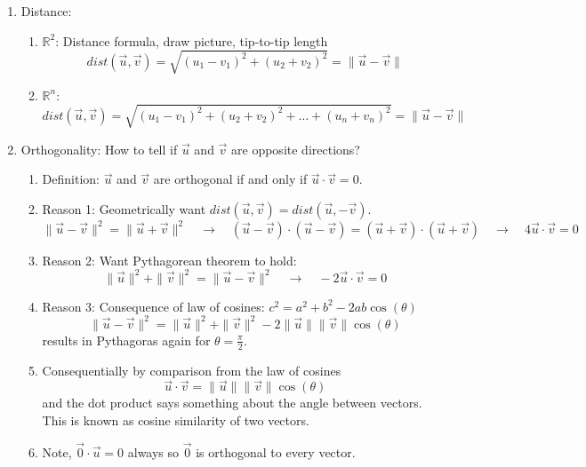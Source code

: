\documentclass{article}
\begin{document}
\begin{enumerate}
\item Distance: 
\begin{enumerate}
\item $\mathbb{R}^2$: Distance formula, draw picture, tip-to-tip length
\[
dist(\vec{u}, \vec{v}) = \sqrt{(u_1-v_1)^2 + (u_2+v_2)^2} = \|\vec{u}-\vec{v}\|
\]%
\item $\mathbb{R}^n$: 
\[
dist(\vec{u}, \vec{v}) = \sqrt{(u_1-v_1)^2 + (u_2+v_2)^2 + \dots  + (u_n+v_n)^2} = \|\vec{u}-\vec{v}\|
\]
\end{enumerate}

\item Orthogonality: How to tell if $\vec{u}$ and $\vec{v}$ are opposite directions?
\begin{enumerate}
\item Definition: $\vec{u}$ and $\vec{v}$ are orthogonal if and only if $\vec{u} \cdot \vec{v} = 0$.
\item Reason 1: Geometrically want $dist(\vec{u},\vec{v}) = dist(\vec{u},-\vec{v})$. 
\[
\| \vec{u}-\vec{v} \|^2 = \| \vec{u}+\vec{v} \|^2 \quad\rightarrow\quad
(\vec{u}-\vec{v}) \cdot (\vec{u}-\vec{v}) = (\vec{u}+\vec{v}) \cdot (\vec{u}+\vec{v}) \quad\rightarrow\quad
4 \vec{u} \cdot \vec{v} = 0
\]
\item Reason 2: Want Pythagorean theorem to hold: 
\[
\|\vec{u} \|^2 + \|\vec{v} \|^2 = \|\vec{u}-\vec{v} \|^2 \quad \rightarrow \quad -2 \vec{u} \cdot \vec{v} = 0
\]
\item Reason 3: Consequence of law of cosines: $c^2 = a^2 + b^2 - 2ab \cos(\theta)$
\[
\| \vec{u} - \vec{v} \|^2 = \| \vec{u} \|^2 + \| \vec{v} \|^2 - 2\| \vec{u} \| \| \vec{v} \| \cos(\theta)
\]
results in Pythagoras again for $\theta = \frac{\pi}{2}$. 
\item Consequentially by comparison from the law of cosines
\[
\vec{u} \cdot \vec{v} = \| \vec{u} \| \| \vec{v} \| \cos(\theta)
\]
and the dot product says something about the angle between vectors. This is known as cosine similarity of two vectors.
\item Note, $\vec{0} \cdot \vec{u}=0$ always so $\vec{0}$ is orthogonal to every vector. 
\end{enumerate}


\end{enumerate}
\end{document}
